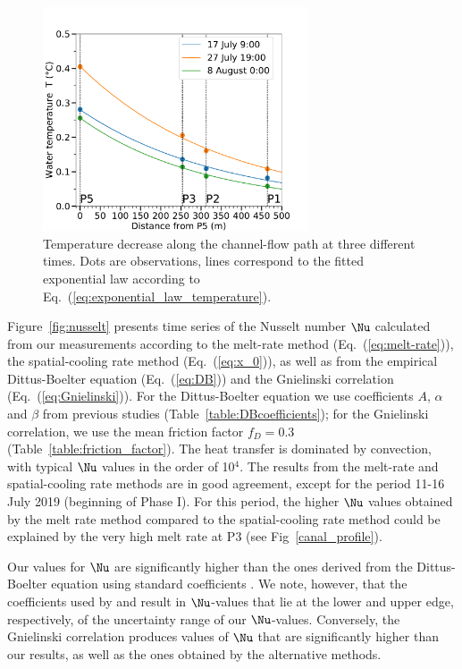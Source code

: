 \begin{figure}[H]
    \centering
    \includegraphics[width=0.7\textwidth]{chapters/chapter_plainemorte/fig07.pdf}
    \caption{Temperature decrease along the channel-flow path at three different times. Dots are observations, lines correspond to the fitted exponential law according to Eq.~(\ref{eq:exponential_law_temperature}).}
    \label{fig:exponential_temperature_decrease}
\end{figure}

Figure~\ref{fig:nusselt} presents time series of the Nusselt number $\Nu$ calculated from our measurements according to the melt-rate method (Eq.~(\ref{eq:melt-rate})), the spatial-cooling rate method (Eq.~(\ref{eq:x_0})), as well as from the empirical Dittus-Boelter equation (Eq.~(\ref{eq:DB})) and the Gnielinski correlation (Eq.~(\ref{eq:Gnielinski})). For the Dittus-Boelter equation we use coefficients $A$, $\alpha$ and $\beta$ from previous studies (Table~\ref{table:DBcoefficients}); for the Gnielinski correlation, we use the mean friction factor $f_D = 0.3$ (Table~\ref{table:friction_factor}). The heat transfer is dominated by convection, with typical $\Nu$ values in the order of 10$^4$. The results from the melt-rate and spatial-cooling rate methods are in good agreement, except for the period 11-16 July 2019 (beginning of Phase I). For this period, the higher $\Nu$ values obtained by the melt rate method compared to the spatial-cooling rate method could be explained by the very high melt rate at P3 (see Fig~\ref{canal_profile}).

Our values for $\Nu$ are significantly higher than the ones derived from the Dittus-Boelter equation using standard coefficients \citep[e.g.][]{Clarke2003}. We note, however, that the coefficients used by \cite{Lunardini&al1986} and \cite{Vincent&al2010} result in $\Nu$-values that lie at the lower and upper edge, respectively, of the uncertainty range of our $\Nu$-values. Conversely, the Gnielinski correlation produces values of $\Nu$ that are significantly higher than our results, as well as the ones obtained by the alternative methods.


